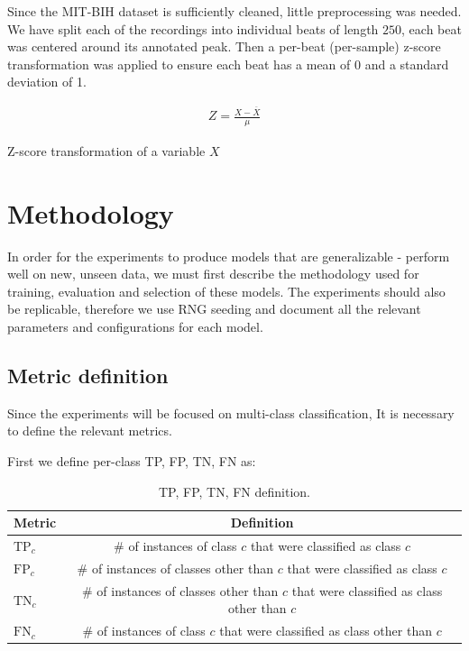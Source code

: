 Since the MIT-BIH dataset is sufficiently cleaned, little preprocessing was needed.
We have split each of the recordings into individual beats of length $250$, each beat was centered around its annotated peak.
Then a per-beat (per-sample) z-score transformation was applied to ensure each beat has a mean of 0 and a standard deviation of 1.

\begin{align}
    Z = \frac{X - \overline{X}}{\mu}
\end{align}

\begin{center}
    \small Z-score transformation of a variable $X$
\end{center}


\section{Methodology}\label{sec:04_methodology}

In order for the experiments to produce models that are generalizable - perform well on new, unseen data, we must first describe the methodology used for training, evaluation and selection of these models.
The experiments should also be replicable, therefore we use RNG seeding and document all the relevant parameters and configurations for each model.

\subsection{Metric definition}

Since the experiments will be focused on multi-class classification, It is necessary to define the relevant metrics.

\bigskip

\noindent First we define per-class TP, FP, TN, FN as:

\begin{table}[H]
    \centering
    \scriptsize
    \renewcommand{\arraystretch}{1.1}

    \begin{tabularx}{\textwidth}{X c}
        \toprule
        \textbf{Metric} & \textbf{Definition} \tabularnewline \midrule
        $\mathrm{TP}_c$ & \# of instances of class $c$ that were classified as class $c$ \tabularnewline
        $\mathrm{FP}_c$ & \# of instances of classes other than $c$ that were classified as class $c$ \tabularnewline
        $\mathrm{TN}_c$ & \# of instances of classes other than $c$ that were classified as class other than $c$ \tabularnewline
        $\mathrm{FN}_c$ & \# of instances of class $c$ that were classified as class other than $c$ \tabularnewline
        \bottomrule
    \end{tabularx}

    \caption[TP, FP, TN, FN definition]{TP, FP, TN, FN definition.}
    \label{tab:04_tp_fp_tn_fn}
\end{table}

